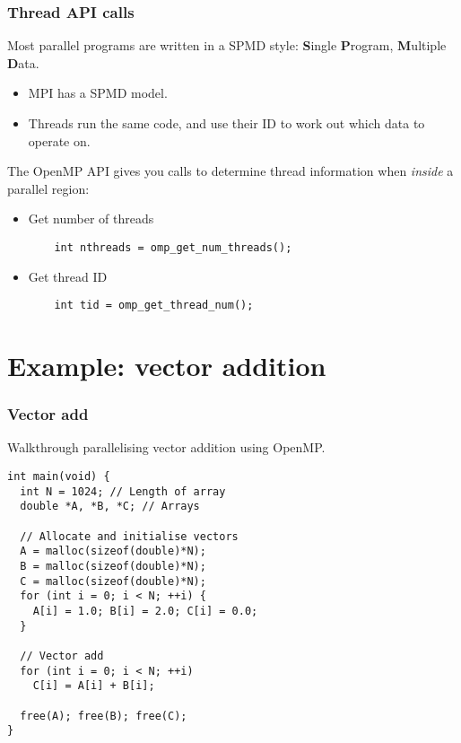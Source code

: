 \documentclass{beamer}
\begin{document}
\begin{frame}[fragile]
\frametitle{Thread API calls}
Most parallel programs are written in a SPMD style: \newline
{\bf S}ingle {\bf P}rogram, {\bf M}ultiple {\bf D}ata.
\begin{itemize}
  \item MPI has a SPMD model.
  \item Threads run the same code, and use their ID to work out which data to operate on.
\end{itemize}

The OpenMP API gives you calls to determine thread information when \emph{inside} a parallel region:
\begin{itemize}
  \item Get number of threads
    \begin{verbatim}
    int nthreads = omp_get_num_threads();
    \end{verbatim}

  \item Get thread ID
    \begin{verbatim}
    int tid = omp_get_thread_num();
    \end{verbatim}

\end{itemize}
\end{frame}

\section{Example: vector addition}
\begin{frame}[fragile]
\frametitle{Vector add}
Walkthrough parallelising vector addition using OpenMP.

\begin{verbatim}
int main(void) {
  int N = 1024; // Length of array
  double *A, *B, *C; // Arrays

  // Allocate and initialise vectors
  A = malloc(sizeof(double)*N);
  B = malloc(sizeof(double)*N);
  C = malloc(sizeof(double)*N);
  for (int i = 0; i < N; ++i) {
    A[i] = 1.0; B[i] = 2.0; C[i] = 0.0;
  }

  // Vector add
  for (int i = 0; i < N; ++i)
    C[i] = A[i] + B[i];

  free(A); free(B); free(C);
}
\end{verbatim}
\end{frame}
\end{document}
